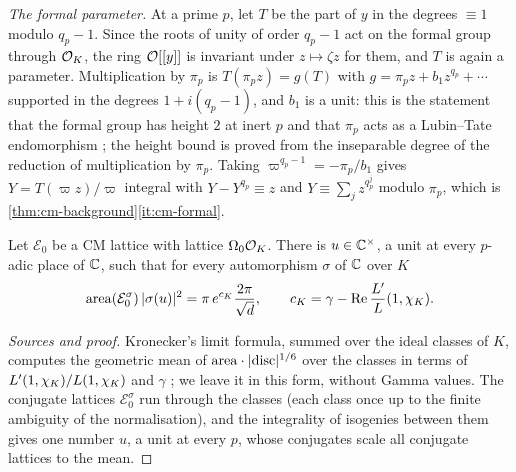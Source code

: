 \emph{The formal parameter.} At a prime $p$, let $T$ be the part of $y$ in the degrees $\equiv1$ modulo
$q_p-1$. Since the roots of unity of order $q_p-1$ act on the formal group through $\mathcal{O}_K$, the ring
$\mathcal{O}[[y]]$ is invariant under $z\mapsto\zeta z$ for them, and $T$ is again a parameter. Multiplication by
$\pi_p$ is $T(\pi_pz)=g(T)$ with $g=\pi_pz+b_1z^{q_p}+\cdots$ supported in the degrees $1+i(q_p-1)$, and
$b_1$ is a unit: this is the statement that the formal group has height $2$ at inert $p$ and that
$\pi_p$ acts as a Lubin--Tate endomorphism \cite{LubinTate1965}; the height bound is proved from the
inseparable degree of the reduction of multiplication by $\pi_p$. Taking $\varpi^{q_p-1}=-\pi_p/b_1$
gives $Y=T(\varpi z)/\varpi$ integral with $Y-Y^{q_p}\equiv z$ and $Y\equiv\sum_jz^{q_p^j}$ modulo $\pi_p$,
which is \cref{thm:cm-background}\ref{it:cm-formal}.

\begin{theorem}\label{thm:B-chowla-selberg}
Let $\mathcal E_0$ be a CM lattice with lattice $\Omega_0\mathcal{O}_K$. There is $u\in\mathbb{C}^\times$, a unit at every
$p$-adic place of $\mathbb{C}$, such that for every automorphism $\sigma$ of $\mathbb{C}$ over $K$
\[
  \mathrm{area}(\mathcal E_0^\sigma)\,\lvert \sigma(u)\rvert^2=\pi\,e^{c_K}\frac{2\pi}{\sqrt d},\qquad
  c_K=\gamma-\operatorname{Re}\frac{L'}L(1,\chi_K).
\]
\end{theorem}

\begin{proof}[Sources and proof]
Kronecker's limit formula, summed over the ideal classes of $K$, computes the geometric mean of
$\mathrm{area}\cdot\lvert \operatorname{disc}\rvert^{1/6}$ over the classes in terms of $L'(1,\chi_K)/L(1,\chi_K)$ and
$\gamma$ \cite{ChowlaSelberg1967}; we leave it in this form, without Gamma values. The conjugate lattices
$\mathcal E_0^\sigma$ run through the classes (each class once up to the finite ambiguity of the
normalisation), and the integrality of isogenies between them gives one number $u$, a unit at every
$p$, whose conjugates scale all conjugate lattices to the mean.
\end{proof}

